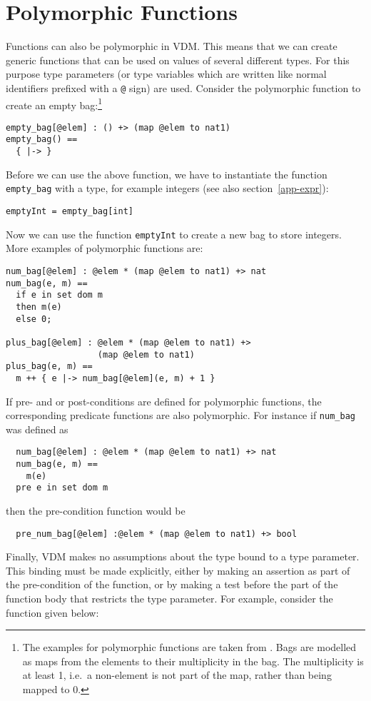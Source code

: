 \documentclass{overturerepchap}
\begin{document}
\section{Polymorphic Functions}

Functions can also be polymorphic in VDM. This means that we can create
generic functions that can be used on values of several different
types. For this purpose type parameters (or type variables which are
written like normal identifiers prefixed with a {\tt @} sign) are
used. Consider the polymorphic function to create an empty
bag:\footnote{The examples for polymorphic functions are taken from
\cite{Dawes91}. Bags are modelled as maps from the elements to their
multiplicity in the bag. The multiplicity is at least 1, i.e.\ a
non-element is not part of the map, rather than being mapped to 0.}
\begin{lstlisting}
empty_bag[@elem] : () +> (map @elem to nat1)
empty_bag() ==
  { |-> }
\end{lstlisting}
Before we can use the above function, we have to instantiate the
function {\tt empty\_bag} with a type, for example integers (see also
section~\ref{app-expr}):
\begin{lstlisting}
emptyInt = empty_bag[int]
\end{lstlisting}
Now we can use the function {\tt emptyInt} to create a new bag to store
integers. More examples of polymorphic functions are:
\begin{lstlisting}
num_bag[@elem] : @elem * (map @elem to nat1) +> nat
num_bag(e, m) ==
  if e in set dom m
  then m(e)
  else 0;

plus_bag[@elem] : @elem * (map @elem to nat1) +>
                  (map @elem to nat1)
plus_bag(e, m) ==
  m ++ { e |-> num_bag[@elem](e, m) + 1 }
\end{lstlisting}
If pre- and or post-conditions are defined for polymorphic functions, the
corresponding predicate functions are also polymorphic. For instance
if \texttt{num\_bag} was defined as
\begin{lstlisting}
  num_bag[@elem] : @elem * (map @elem to nat1) +> nat
  num_bag(e, m) ==
    m(e)
  pre e in set dom m
\end{lstlisting}
then the pre-condition function would be
\begin{lstlisting}
  pre_num_bag[@elem] :@elem * (map @elem to nat1) +> bool
\end{lstlisting}

\noindent Finally, VDM makes no assumptions about the type bound to a type parameter. This binding must be made explicitly, either by making an assertion as part of the pre-condition of the function, or by making a test before the part of the function body that restricts the type parameter. For example, consider the function given below:
\end{document}
